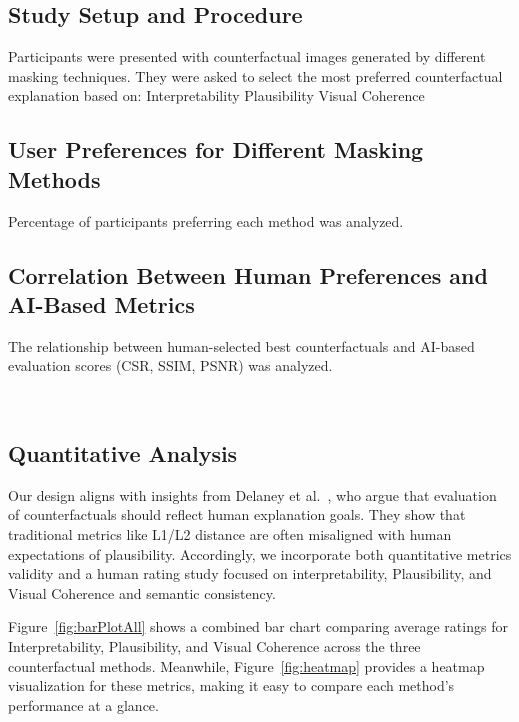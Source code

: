 \subsection{Study Setup and Procedure}
Participants were presented with counterfactual images generated by different masking techniques.
They were asked to select the most preferred counterfactual explanation based on:
Interpretability
Plausibility
Visual Coherence

\subsection{User Preferences for Different Masking Methods}
Percentage of participants preferring each method was analyzed.


\subsection{Correlation Between Human Preferences and AI-Based Metrics}
The relationship between human-selected best counterfactuals and AI-based evaluation scores (CSR, SSIM, PSNR) was analyzed.


\

\subsection{Quantitative Analysis}
\label{subsec:quantitative_analysis}

Our design aligns with insights from Delaney et al.~\cite{DELANEY2023103995}, who argue that evaluation of counterfactuals should reflect human explanation goals. They show that traditional metrics like L1/L2 distance are often misaligned with human expectations of plausibility. Accordingly, we incorporate both quantitative metrics validity and a human rating study focused on interpretability, Plausibility, and Visual Coherence and semantic consistency.

Figure~\ref{fig:barPlotAll} shows a combined bar chart comparing average ratings for Interpretability, Plausibility, and Visual Coherence 
across the three counterfactual methods. Meanwhile, Figure~\ref{fig:heatmap} provides a heatmap visualization for these metrics, 
making it easy to compare each method's performance at a glance.

